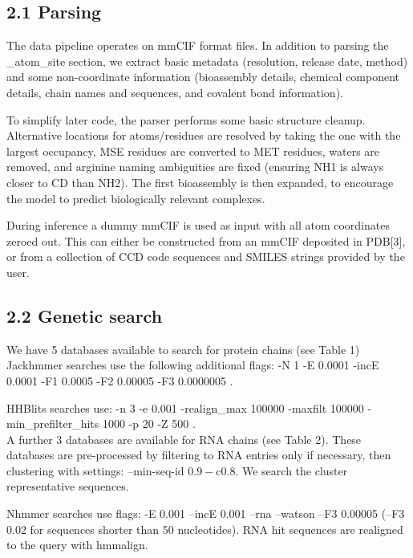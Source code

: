 \documentclass[10pt]{article}
\begin{document}
\subsection*{2.1 Parsing}
The data pipeline operates on mmCIF format files. In addition to parsing the \_atom\_site section, we extract basic metadata (resolution, release date, method) and some non-coordinate information (bioassembly details, chemical component details, chain names and sequences, and covalent bond information).

To simplify later code, the parser performs some basic structure cleanup. Alternative locations for atoms/residues are resolved by taking the one with the largest occupancy, MSE residues are converted to MET residues, waters are removed, and arginine naming ambiguities are fixed (ensuring NH1 is always closer to CD than NH2). The first bioassembly is then expanded, to encourage the model to predict biologically relevant complexes.

During inference a dummy mmCIF is used as input with all atom coordinates zeroed out. This can either be constructed from an mmCIF deposited in PDB[3], or from a collection of CCD code sequences and SMILES strings provided by the user.

\subsection*{2.2 Genetic search}
We have 5 databases available to search for protein chains (see Table 1)\\
Jackhmmer searches use the following additional flags: -N 1 -E 0.0001 -incE 0.0001 -F1 0.0005 -F2 0.00005 -F3 0.0000005 .

HHBlits searches use: -n 3 -e 0.001 -realign\_max 100000 -maxfilt 100000 -min\_prefilter\_hits 1000 -p 20 -Z 500 .\\
A further 3 databases are available for RNA chains (see Table 2). These databases are pre-processed by filtering to RNA entries only if necessary, then clustering with settings: --min-seq-id $0.9-\mathrm{c} 0.8$. We search the cluster representative sequences.

Nhmmer searches use flags: -E 0.001 --incE 0.001 --rna --watson --F3 0.00005 (--F3 0.02 for sequences shorter than 50 nucleotides). RNA hit sequences are realigned to the query with hmmalign.
\end{document}
